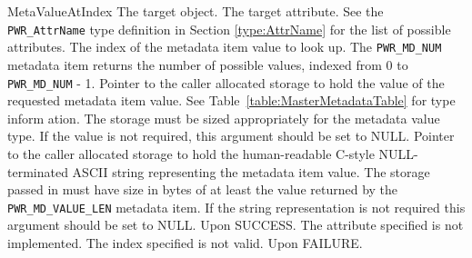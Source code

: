 %
\begin{prototype}{MetaValueAtIndex}
			{\pInput}{The target object.}
		{\pInput}{The target attribute. See the \texttt{PWR_AttrName} type definition in Section \ref{type:AttrName} for the list of possible attributes.}
		{\pInput}{The index of the metadata item value to look up. The \texttt{PWR\_MD\_NUM} metadata item returns the number of possible values, indexed from 0 to \texttt{PWR\_MD\_NUM} - 1.}
			{\pOutput}{Pointer to the caller allocated storage to hold the value of the requested metadata item value. See Table~\ref{table:MasterMetadataTable} for type inform     ation. The storage must be sized appropriately for the metadata value type. If the value is not required, this argument should be set to NULL.}
		{\pOutput}{Pointer to the caller allocated storage to hold the human-readable C-style NULL-terminated ASCII string representing the metadata item value. The storage passed in must have size in bytes of at least the value returned by the \texttt{PWR\_MD\_VALUE\_LEN} metadata item. If the string representation is not required this argument should be set to NULL.}
	 	{Upon SUCCESS.}
	 	{The attribute specified is not implemented.}
	 	{The index specified is not valid.}
	 	{Upon FAILURE.}
\end{prototype}

